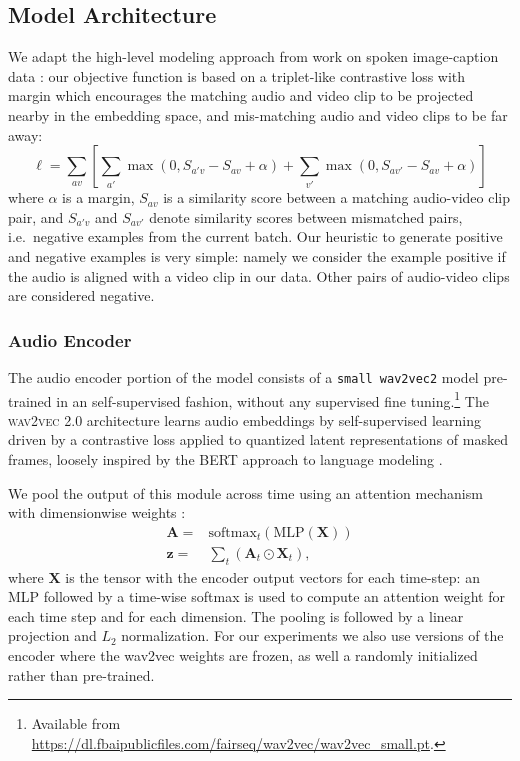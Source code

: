 \subsection{Model Architecture}
\label{sec:model}
We adapt the high-level modeling approach from work on spoken
image-caption data
\citep{harwath2016unsupervised,chrupala-etal-2017-representations}:
our objective function is based on a triplet-like contrastive loss with margin which
encourages the matching audio and video clip to be projected nearby in
the embedding space, and mis-matching audio and video clips to be far
away:
\begin{dmath}
  \ell = \sum_{av}\left[\sum_{a'} \max(0, S_{a'v} - S_{av} +
    \alpha) + \sum_{v'} \max(0, S_{av'} - S_{av} + \alpha) \right]
  \label{eq:triplet}
\end{dmath}
where $\alpha$ is a margin, $S_{av}$ is a similarity score between a
matching audio-video clip pair, and $S_{a'v}$ and $S_{av'}$ denote
similarity scores between mismatched pairs, i.e.\ negative examples
from the current batch. Our heuristic to generate positive and
negative examples is very simple: namely we consider the example
positive if the audio is aligned with a video clip in our
data. Other pairs of audio-video clips are considered negative.

\subsubsection{Audio Encoder}
The audio encoder portion of the model consists of a {\tt small
  wav2vec2} model \citep{wav2vec2} pre-trained in an self-supervised
fashion, without any supervised fine tuning.\footnote{Available from
  \url{https://dl.fbaipublicfiles.com/fairseq/wav2vec/wav2vec_small.pt}.}
The \textsc{wav2vec 2.0} architecture learns audio embeddings by
self-supervised learning driven by a contrastive loss applied to 
quantized latent representations of masked frames, loosely inspired by
the BERT approach to language modeling \citep{devlin-etal-2019-bert}.

We pool the output of this module across time using
an attention mechanism with dimensionwise weights \citep{Merkx2019}:
\begin{equation}
  \begin{aligned}
    \mathbf{A} = & \mathrm{softmax}_t\left(\mathrm{MLP}(\mathbf{X})\right)\\
    \mathbf{z} = & \sum_t \left( \mathbf{A}_{t} \odot \mathbf{X}_{t} \right),
  \end{aligned}
  \label{eq:att-pool}
\end{equation}
where $\mathbf{X}$ is the tensor with the encoder output vectors for
each time-step: an MLP followed by a time-wise
softmax is used to compute an attention weight for each time step and for each
dimension.
The pooling is followed by a linear projection and $L_2$
normalization. For our experiments we also use versions of the encoder
where the wav2vec weights are frozen, as well a randomly initialized
rather than pre-trained.



